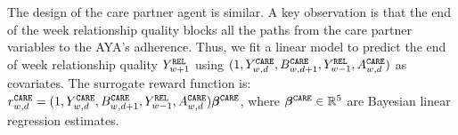 The design of the care partner agent is similar. A key observation is that the end of the week relationship quality blocks all the paths from the care partner variables to the AYA's adherence. Thus, we fit a linear model to predict the end of week relationship quality $Y_{w+1}^{\tiny\texttt{REL}}$ using $(1, Y_{w,d}^{\tiny\texttt{CARE}}, B_{w,d+1}^{\tiny\texttt{CARE}}, Y_{w-1}^{\tiny\texttt{REL}}, A_{w,d}^{\tiny\texttt{CARE}})$ as covariates. The surrogate reward function is:
    $r_{w, d}^{\tiny\texttt{CARE}} =  (1, Y_{w,d}^{\tiny\texttt{CARE}}, B_{w,d+1}^{\tiny\texttt{CARE}}, Y_{w-1}^{\tiny\texttt{REL}}, A_{w,d}^{\tiny\texttt{CARE}}) {\bm{\beta}}^{\tiny\texttt{CARE}}$, 
where ${\bm{\beta}}^{\tiny\texttt{CARE}} \in \mathbb{R}^{5}$ are Bayesian linear regression estimates. 



